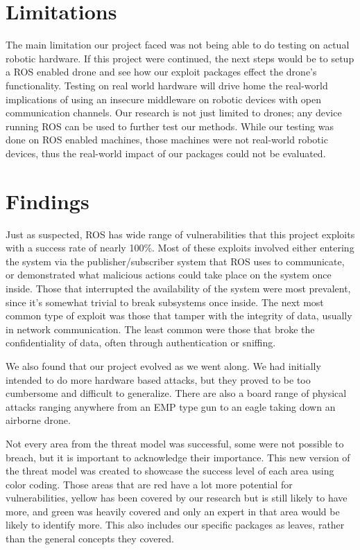 \documentclass[IEEEtran,letterpaper,10pt,notitlepage,draftclsnofoot]{article}
\begin{document}
\section{Limitations}
The main limitation our project faced was not being able to do testing on actual robotic hardware.
If this project were continued, the next steps would be to setup a ROS enabled drone and see how our exploit packages effect the drone's functionality.
Testing on real world hardware will drive home the real-world implications of using an insecure middleware on robotic devices with open communication channels.
Our research is not just limited to drones; any device running ROS can be used to further test our methods.
While our testing was done on ROS enabled machines, those machines were not real-world robotic devices, thus the real-world impact of our packages could not be evaluated.

\section{Findings}
Just as suspected, ROS has wide range of vulnerabilities that this project exploits with a success rate of nearly 100\%.
Most of these exploits involved either entering the system via the publisher/subscriber system that ROS uses to communicate, or demonstrated what malicious actions could take place on the system once inside.
Those that interrupted the availability of the system were most prevalent, since it's somewhat trivial to break subsystems once inside.
The next most common type of exploit was those that tamper with the integrity of data, usually in network communication.
The least common were those that broke the confidentiality of data, often through authentication or sniffing.

We also found that our project evolved as we went along.
We had initially intended to do more hardware based attacks, but they proved to be too cumbersome and difficult to generalize.
There are also a board range of physical attacks ranging anywhere from an EMP type gun to an eagle taking down an airborne drone.

Not every area from the threat model was successful, some were not possible to breach, but it is important to acknowledge their importance.
This new version of the threat model was created to showcase the success level of each area using color coding.
Those areas that are red have a lot more potential for vulnerabilities, yellow has been covered by our research but is still likely to have more, and green was heavily covered and only an expert in that area would be likely to identify more.
This also includes our specific packages as leaves, rather than the general concepts they covered.
\end{document}
